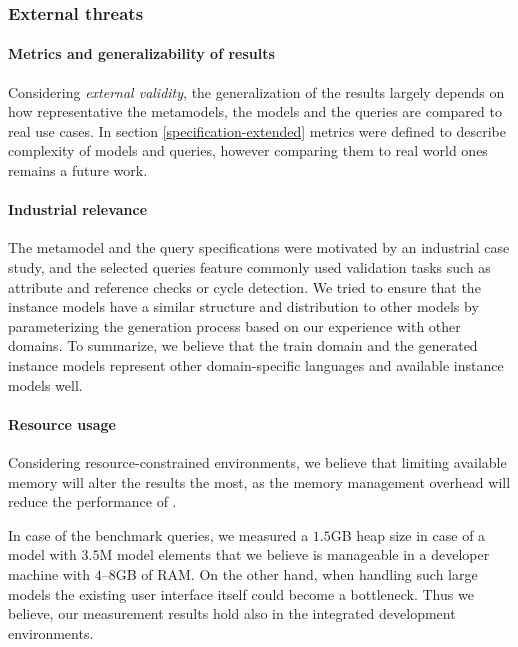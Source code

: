 \subsubsection{External threats}

\paragraph{Metrics and generalizability of results}
Considering \emph{external validity}, the generalization of the results largely
depends on how representative the metamodels, the models and the queries are
compared to real use cases. In section \ref{specification-extended} metrics were
defined to describe complexity of models and queries, however comparing them to
real world ones remains a future work.

\paragraph{Industrial relevance}
The metamodel and the query specifications were motivated by an industrial case
study, and the selected queries feature commonly used validation tasks such as
attribute and reference checks or cycle detection. We tried to ensure that the
instance models have a similar structure and distribution to other models by
parameterizing the generation process based on our experience with other
domains. To summarize, we believe that the train domain and the generated
instance models represent other domain-specific languages and available instance
models well.

\paragraph{Resource usage}
Considering resource-constrained environments, we believe that limiting
available memory will alter the results the most, as the memory management
overhead will reduce the performance of \eiq{}.

In case of the benchmark queries, we measured a $1.5$GB heap size in case of a
model with $3.5$M model elements that we believe is manageable in a developer
machine with $4$--$8$GB of RAM. On the other hand, when handling such large
models the existing user interface itself could become a bottleneck. Thus we
believe, our measurement results hold also in the integrated development
environments.
